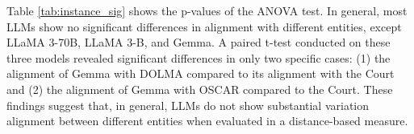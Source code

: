 
Table \ref{tab:instance_sig} shows the p-values of the ANOVA test. In general, most LLMs show no significant differences in alignment with different entities, except LLaMA 3-70B, LLaMA 3-B, and Gemma. A paired t-test conducted on these three models revealed significant differences in only two specific cases: (1) the alignment of Gemma with DOLMA compared to its alignment with the Court and (2) the alignment of Gemma with OSCAR compared to the Court. These findings suggest that, in general, LLMs do not show substantial variation alignment between different entities when evaluated in a distance-based measure. 






